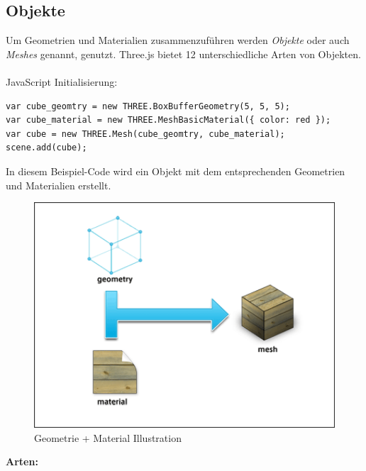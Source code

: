 \subsection{Objekte}
Um Geometrien und Materialien zusammenzuführen werden \textit{Objekte} oder auch \textit{Meshes} genannt, genutzt. Three.js bietet 12 unterschiedliche Arten von Objekten.\\ \\
JavaScript Initialisierung:
\begin{lstlisting}
var cube_geomtry = new THREE.BoxBufferGeometry(5, 5, 5);
var cube_material = new THREE.MeshBasicMaterial({ color: red });
var cube = new THREE.Mesh(cube_geomtry, cube_material);
scene.add(cube);
\end{lstlisting}
In diesem Beispiel-Code wird ein Objekt mit dem entsprechenden Geometrien und Materialien erstellt.\\
\begin{figure}[h]
    \centering
    \includegraphics[width=1\textwidth]{images/geoplusmat.png}
    \caption{Geometrie + Material Illustration \cite{geoplusmat}}
    \label{fig:my_label}
\end{figure}
\newpage
\textbf{Arten:}\\
